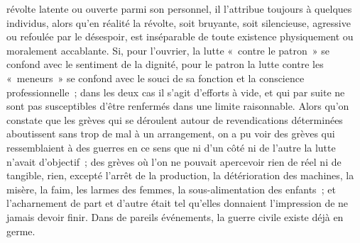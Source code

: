 \documentclass[french,twoside]{book} %
\begin{document}
révolte latente ou ouverte parmi son personnel, il l'attribue toujours à quelques individus, alors qu'en réalité la révolte, soit bruyante, soit silencieuse, agressive ou refoulée par le désespoir, est inséparable de toute existence physiquement ou morale­ment accablante. Si, pour l'ouvrier, la lutte « contre le patron » se confond avec le sentiment de la dignité, pour le patron la lutte contre les « meneurs » se confond avec le souci de sa fonction et la conscience professionnelle ; dans les deux cas il s'agit d'efforts à vide, et qui par suite ne sont pas susceptibles d'être renfermés dans une limite raisonnable. Alors qu’on constate que les grèves qui se déroulent autour de revendications déterminées aboutissent sans trop de mal à un arrangement, on a pu voir des grèves qui ressemblaient à des guerres en ce sens que ni d'un côté ni de l'autre la lutte n'avait d'objectif ; des grèves où l'on ne pouvait apercevoir rien de réel ni de tangible, rien, excepté l'arrêt de la production, la détérioration des machines, la misère, la faim, les larmes des femmes, la sous-alimentation des enfants ; et l'acharnement de part et d'autre était tel qu'elles donnaient l'impression de ne jamais devoir finir. Dans de pareils événements, la guerre civile existe déjà en germe.\par
\end{document}
